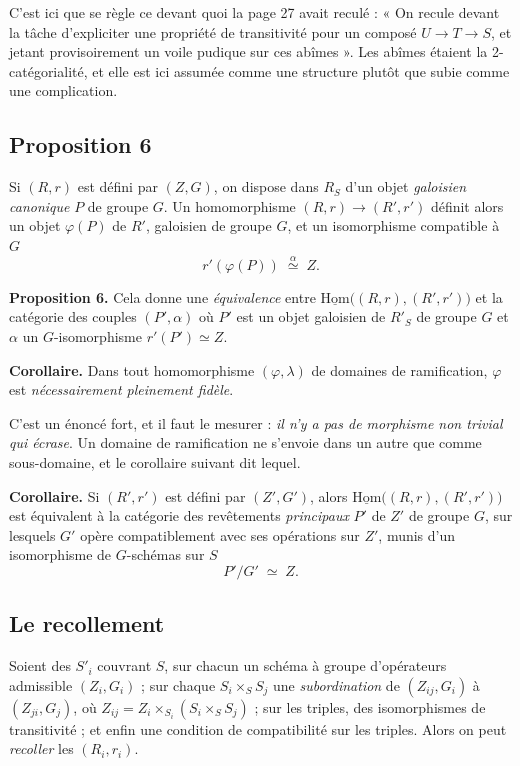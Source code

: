 \documentclass[11pt,a4paper]{article}
\begin{document}
C'est ici que se règle ce devant quoi la page 27 avait reculé : « On recule
devant la tâche d'expliciter une propriété de transitivité pour un composé
$U \to T \to S$, et jetant provisoirement un voile pudique sur ces abîmes ».
Les abîmes étaient la 2-catégorialité, et elle est ici assumée comme une
structure plutôt que subie comme une complication.

\subsection*{Proposition 6}

Si $(R, r)$ est défini par $(Z, G)$, on dispose dans $R_{S}$ d'un objet
\emph{galoisien canonique} $P$ de groupe $G$. Un homomorphisme
$(R, r) \to (R', r')$ définit alors un objet $\varphi(P)$ de $R'$, galoisien de
groupe $G$, et un isomorphisme compatible à $G$
\[
  r'(\varphi(P)) \;\overset{\alpha}{\simeq}\; Z .
\]

\textbf{Proposition 6.} Cela donne une \emph{équivalence} entre
$\underline{\mathrm{Hom}}\bigl((R,r),(R',r')\bigr)$ et la catégorie des couples
$(P', \alpha)$ où $P'$ est un objet galoisien de $R'_{S}$ de groupe $G$ et
$\alpha$ un $G$-isomorphisme $r'(P') \simeq Z$.

\textbf{Corollaire.} Dans tout homomorphisme $(\varphi, \lambda)$ de domaines
de ramification, $\varphi$ est \emph{nécessairement pleinement fidèle}.

C'est un énoncé fort, et il faut le mesurer : \emph{il n'y a pas de morphisme
non trivial qui écrase}. Un domaine de ramification ne s'envoie dans un autre
que comme sous-domaine, et le corollaire suivant dit lequel.

\textbf{Corollaire.} Si $(R', r')$ est défini par $(Z', G')$, alors
$\underline{\mathrm{Hom}}\bigl((R,r),(R',r')\bigr)$ est équivalent à la
catégorie des revêtements \emph{principaux} $P'$ de $Z'$ de groupe $G$, sur
lesquels $G'$ opère compatiblement avec ses opérations sur $Z'$, munis d'un
isomorphisme de $G$-schémas sur $S$
\[
  P'/G' \;\simeq\; Z .
\]

\subsection*{Le recollement}

Soient des $S'_{i}$ couvrant $S$, sur chacun un schéma à groupe d'opérateurs
admissible $(Z_{i}, G_{i})$ ; sur chaque $S_{i} \times_{S} S_{j}$ une
\emph{subordination} de $(Z_{ij}, G_{i})$ à $(Z_{ji}, G_{j})$, où
$Z_{ij} = Z_{i} \times_{S_{i}} (S_{i} \times_{S} S_{j})$ ; sur les triples, des
isomorphismes de transitivité ; et enfin une condition de compatibilité sur les
triples. Alors on peut \emph{recoller} les $(R_{i}, r_{i})$.
\end{document}
